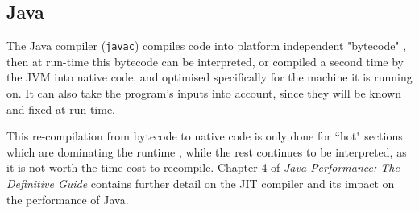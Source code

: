 \subsection{Java}

\par The Java compiler (\verb|javac|) compiles code into platform independent "bytecode" \cite{javac}, then at run-time this bytecode can be interpreted, or compiled a second time by the JVM into native code, and optimised specifically for the machine it is running on. It can also take the program's inputs into account, since they will be known and fixed at run-time.
\par
This re-compilation from bytecode to native code is only done for ``hot" sections which are dominating the runtime \cite{javac}, while the rest continues to be interpreted, as it is not worth the time cost to recompile. Chapter 4 of \textit{Java Performance: The Definitive Guide} \cite{javaPerf} contains further detail on the JIT compiler and its impact on the performance of Java.
\par

